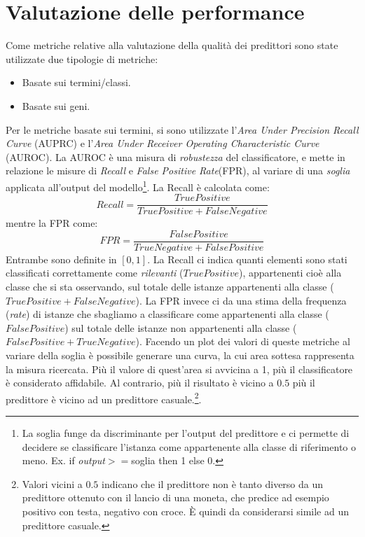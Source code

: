 \documentclass[12pt]{report}
\begin{document}
\section{Valutazione delle performance}
Come metriche relative alla valutazione della qualità dei predittori sono state utilizzate due tipologie di metriche:

\begin{itemize}
\item Basate sui termini/classi. 
\item Basate sui geni.
\end{itemize} 

Per le metriche basate sui termini, si sono utilizzate l'\textit{Area Under Precision Recall Curve} (AUPRC) e l'\textit{Area Under Receiver Operating Characteristic Curve} (AUROC). 
\newline
\newline
La AUROC è una misura di \emph{robustezza} del classificatore, e mette in relazione le misure di \emph{Recall} e \emph{False Positive Rate}(FPR), al variare di una \emph{soglia} applicata all'output del modello\footnote{\footnotesize{La soglia funge da discriminante per l'output del predittore e ci permette di decidere se classificare l'istanza come appartenente alla classe di riferimento o meno. Ex. if \emph{output}$>=$soglia then 1 else 0.}}. La Recall è calcolata come:
\[
Recall = \frac{TruePositive}{TruePositive+FalseNegative}
\]
mentre la FPR come:
\[
FPR = \frac{FalsePositive}{TrueNegative+FalsePositive}
\]
Entrambe sono definite in $[0,1]$. La Recall ci indica quanti elementi sono stati classificati correttamente come \emph{rilevanti} ($TruePositive$), appartenenti cioè alla classe che si sta osservando, sul totale delle istanze appartenenti alla classe ($TruePositive+FalseNegative$). La FPR invece ci da una stima della frequenza (\emph{rate}) di istanze che sbagliamo a classificare come appartenenti alla classe ($FalsePositive$) sul totale delle istanze non appartenenti alla classe ($FalsePositive+TrueNegative$).
Facendo un plot dei valori di queste metriche al variare della soglia è possibile generare una curva, la cui area sottesa rappresenta la misura ricercata. Più il valore di quest'area si avvicina a 1, più il classificatore è considerato affidabile. Al contrario, più il risultato è vicino a $0.5$ più il predittore è vicino ad un predittore casuale.\footnote{\footnotesize{Valori vicini a $0.5$ indicano che il predittore non è tanto diverso da un predittore ottenuto con il lancio di una moneta, che predice ad esempio positivo con testa, negativo con croce. È quindi da considerarsi simile ad un predittore casuale.}}.
\end{document}
